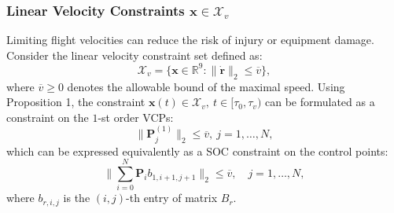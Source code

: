 \documentclass[journal,10pt]{IEEEtran}
\newcommand{\vect}[1]{\boldsymbol{\mathbf{#1}}}
\newif\ifdraft
\newcommand{\XX}[1]{\ifdraft{\color{red}[{\bf XX}: #1]}\fi}
\newcommand{\VF}[1]{\ifdraft{\color{blue}[{\bf VF}: #1]}\fi}
\begin{document}
\subsubsection{Linear Velocity Constraints $\vect{x}\in\mathcal{X}_v$} Limiting flight velocities can  reduce the risk of injury or equipment damage. Consider the linear velocity constraint set defined as:
\begin{equation}\label{const_vel}
    \mathcal{X}_{v} = \{\vect{x}\in\mathbb{R}^{9}:\|\dot{\vect{r}}\|_2\leq \overline{v}\},
\end{equation} 
where $\overline{v}\geq0$ denotes the allowable bound of the maximal speed. Using Proposition 1, the constraint $\vect{x}(t)\in\mathcal{X}_v, \ t\in[\tau_0,\tau_v)$ can be formulated as a constraint on the $1$-st order VCPs: 
$$
\|\vect{P}_j^{(1)}\|_2 \leq \overline{v},\ j=1,\ldots,N,
$$ 
which can be expressed equivalently as a SOC constraint on the control points:
\begin{equation} \label{cp_vel}
    \bigg\|\sum_{i=0}^N\vect{P}_ib_{1,i+1,j+1}\bigg\|_2\leq \overline{v}, \quad j=1,\ldots,N,
\end{equation}
where $b_{r,i,j}$ is the $(i,j)$-th entry of matrix $B_r$.


\end{document}
